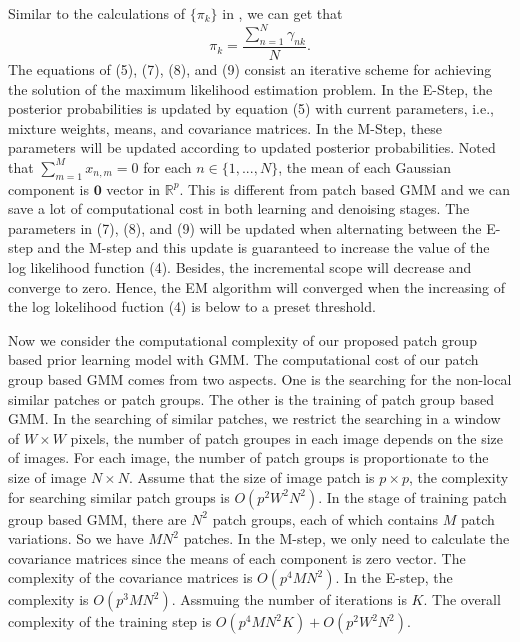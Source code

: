 \documentclass[10pt,twocolumn,letterpaper]{article}
\begin{document}
Similar to the calculations of $\{\pi_{k}\}$ in \cite{Bishop}, we can get that
\begin{equation}
\pi_{k} = \frac{\sum_{n=1}^{N}\gamma_{nk}}{N}.
\end{equation}
The equations of (5), (7), (8), and (9) consist an iterative scheme for achieving the solution of the maximum likelihood estimation problem. In the E-Step, the posterior probabilities is updated by equation (5) with current parameters, i.e., mixture weights, means, and covariance matrices. In the M-Step, these parameters will be updated according to updated posterior probabilities. Noted that $\sum_{m=1}^{M}x_{n,m}=0$ for each $n\in \{1,...,N\}$, the mean of each Gaussian component is $\mathbf{0}$ vector in $\mathbb{R}^{p}$. This is different from patch based GMM and we can save a lot of computational cost in both learning and denoising stages. The parameters in (7), (8), and (9) will be updated when alternating between the E-step and the M-step and this update is guaranteed to increase the value of the log likelihood function (4)\cite{Bishop}. Besides, the incremental scope will decrease and converge to zero. Hence, the EM algorithm will converged when the increasing of the log lokelihood fuction (4) is below to a preset threshold.

Now we consider the computational complexity of our proposed patch group based prior learning model with GMM. The computational cost of our patch group based GMM comes from two aspects. One is the searching for the non-local similar patches or patch groups. The other is the training of patch group based GMM. In the searching of similar patches, we restrict the searching in a window of $W\times W$ pixels, the number of patch groupes in each image depends on the size of images. For each image, the number of patch groups is proportionate to the size of image $N\times N$. Assume that the size of image patch is $p\times p$, the complexity for searching similar patch groups is $O(p^{2}W^{2}N^{2})$. In the stage of training patch group based GMM, there are $N^{2}$ patch groups, each of which contains $M$ patch variations. So we have $MN^{2}$ patches. In the M-step, we only need to calculate the covariance matrices since the means of each component is zero vector. The complexity of the covariance matrices is $O(p^{4}MN^{2})$. In the E-step, the complexity is $O(p^{3}MN^{2})$. Assmuing the number of iterations is $K$. The overall complexity of the training step is $O(p^{4}MN^{2}K)+O(p^{2}W^{2}N^{2})$.
\end{document}
